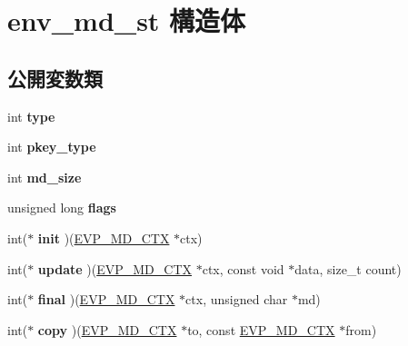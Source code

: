 \hypertarget{structenv__md__st}{}\section{env\+\_\+md\+\_\+st 構造体}
\label{structenv__md__st}
\subsection*{公開変数類}
\begin{DoxyCompactItemize}
\item 
\hypertarget{structenv__md__st_a23f72d7bf1652d69a85942f66f55df01}{}int {\bfseries type}\label{structenv__md__st_a23f72d7bf1652d69a85942f66f55df01}

\item 
\hypertarget{structenv__md__st_a30d9b3466b50542b6931476f0ecf2351}{}int {\bfseries pkey\+\_\+type}\label{structenv__md__st_a30d9b3466b50542b6931476f0ecf2351}

\item 
\hypertarget{structenv__md__st_a7de9719a79492ba980f18f546ff160cf}{}int {\bfseries md\+\_\+size}\label{structenv__md__st_a7de9719a79492ba980f18f546ff160cf}

\item 
\hypertarget{structenv__md__st_a5096c8e255bb2b2100aeae4d50af2fcb}{}unsigned long {\bfseries flags}\label{structenv__md__st_a5096c8e255bb2b2100aeae4d50af2fcb}

\item 
\hypertarget{structenv__md__st_afe1f83efe755ab7f5887ff46aa1269be}{}int($\ast$ {\bfseries init} )(\hyperlink{structenv__md__ctx__st}{E\+V\+P\+\_\+\+M\+D\+\_\+\+C\+T\+X} $\ast$ctx)\label{structenv__md__st_afe1f83efe755ab7f5887ff46aa1269be}

\item 
\hypertarget{structenv__md__st_a57339bd5446e71a0a827f12d8ba23e40}{}int($\ast$ {\bfseries update} )(\hyperlink{structenv__md__ctx__st}{E\+V\+P\+\_\+\+M\+D\+\_\+\+C\+T\+X} $\ast$ctx, const void $\ast$data, size\+\_\+t count)\label{structenv__md__st_a57339bd5446e71a0a827f12d8ba23e40}

\item 
\hypertarget{structenv__md__st_aa04a65c96264e232f926f2ddf03a5fd3}{}int($\ast$ {\bfseries final} )(\hyperlink{structenv__md__ctx__st}{E\+V\+P\+\_\+\+M\+D\+\_\+\+C\+T\+X} $\ast$ctx, unsigned char $\ast$md)\label{structenv__md__st_aa04a65c96264e232f926f2ddf03a5fd3}

\item 
\hypertarget{structenv__md__st_ac616c2dbbb6a5b70cca668db44500840}{}int($\ast$ {\bfseries copy} )(\hyperlink{structenv__md__ctx__st}{E\+V\+P\+\_\+\+M\+D\+\_\+\+C\+T\+X} $\ast$to, const \hyperlink{structenv__md__ctx__st}{E\+V\+P\+\_\+\+M\+D\+\_\+\+C\+T\+X} $\ast$from)\label{structenv__md__st_ac616c2dbbb6a5b70cca668db44500840}


\end{DoxyCompactItemize}
